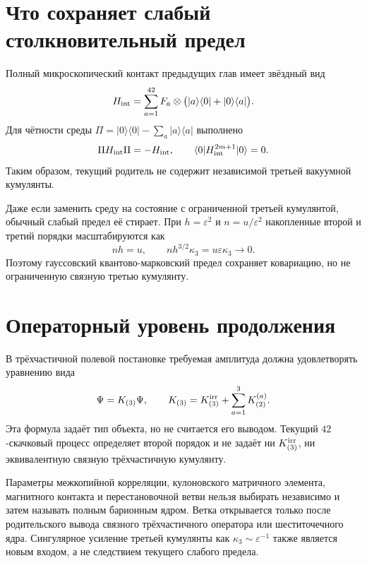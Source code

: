 \section{Что сохраняет слабый столкновительный предел}

Полный микроскопический контакт предыдущих глав имеет звёздный вид
\begin{equation}
 H_{\rm int}=\sum_{a=1}^{42}F_a\otimes
 \bigl(|a\rangle\langle0|+|0\rangle\langle a|\bigr).
 \label{eq:v8-baryon-star-interaction-recall}
\end{equation}
Для чётности среды
$\Pi=|0\rangle\langle0|-\sum_a|a\rangle\langle a|$ выполнено
\begin{equation}
 \Pi H_{\rm int}\Pi=-H_{\rm int},
 \qquad
 \langle0|H_{\rm int}^{2m+1}|0\rangle=0.
 \label{eq:v8-baryon-star-odd-moment-zero}
\end{equation}
Таким образом, текущий родитель не содержит независимой третьей вакуумной
кумулянты.

Даже если заменить среду на состояние с ограниченной третьей кумулянтой,
обычный слабый предел её стирает. При $h=\varepsilon^2$ и
$n=u/\varepsilon^2$ накопленные второй и третий порядки масштабируются как
\begin{equation}
 n h=u,
 \qquad
 n h^{3/2}\kappa_3=u\varepsilon\kappa_3\longrightarrow0.
 \label{eq:v8-baryon-third-cumulant-collision-scaling}
\end{equation}
Поэтому гауссовский квантово-марковский предел сохраняет ковариацию, но не
ограниченную связную третью кумулянту.

\section{Операторный уровень продолжения}

В трёхчастичной полевой постановке требуемая амплитуда должна удовлетворять
уравнению вида
\begin{equation}
 \Psi=K_{(3)}\Psi,
 \qquad
 K_{(3)}=K_{(3)}^{\rm irr}+\sum_{a=1}^{3}K_{(2)}^{(a)}.
 \label{eq:v8-baryon-faddeev-kernel-target}
\end{equation}
Эта формула задаёт тип объекта, но не считается его выводом. Текущий
$42$-скачковый процесс определяет второй порядок и не задаёт ни
$K_{(3)}^{\rm irr}$, ни эквивалентную связную трёхчастичную кумулянту.

\begin{nogocriterion}
Параметры межкопийной корреляции, кулоновского матричного элемента,
магнитного контакта и перестановочной ветви нельзя выбирать независимо и
затем называть полным барионным ядром. Ветка открывается только после
родительского вывода связного трёхчастичного оператора или шеститочечного
ядра. Сингулярное усиление третьей кумулянты как
$\kappa_3\sim\varepsilon^{-1}$ также является новым входом, а не следствием
текущего слабого предела.
\end{nogocriterion}

